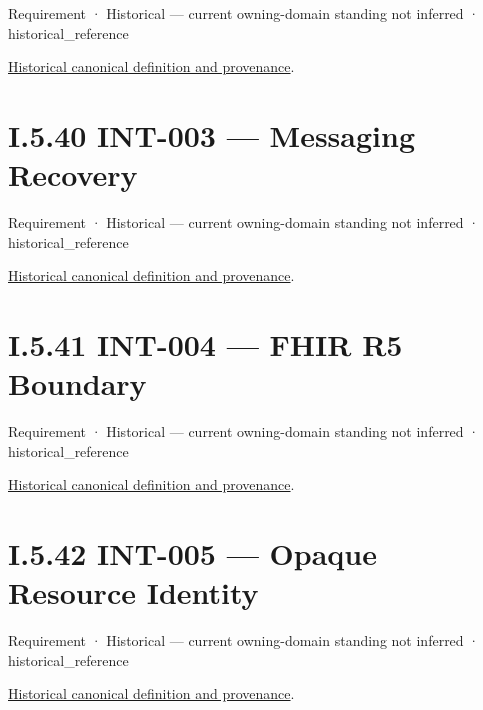 \label{element:aac9b66911e849cb9792c3a2b7eacb88}
{\small Requirement · Historical — current owning-domain standing not inferred · historical\_reference}\par
\href{../../../../continuum/motivation/requirement/aac9b66911e849cb9792c3a2b7eacb88.md}{Historical canonical definition and provenance}.\par
\section*{I.5.40 INT-003 — Messaging Recovery}
\label{navigation:I.5.40}

\label{element:6e72cf09e7cc4acf9466dd39e1a15ae6}
{\small Requirement · Historical — current owning-domain standing not inferred · historical\_reference}\par
\href{../../../../continuum/motivation/requirement/6e72cf09e7cc4acf9466dd39e1a15ae6.md}{Historical canonical definition and provenance}.\par
\section*{I.5.41 INT-004 — FHIR R5 Boundary}
\label{navigation:I.5.41}

\label{element:927b0cf4710e424391120b124067051e}
{\small Requirement · Historical — current owning-domain standing not inferred · historical\_reference}\par
\href{../../../../continuum/motivation/requirement/927b0cf4710e424391120b124067051e.md}{Historical canonical definition and provenance}.\par
\section*{I.5.42 INT-005 — Opaque Resource Identity}
\label{navigation:I.5.42}

\label{element:91bd7a8732b3468b84be2493103433e7}
{\small Requirement · Historical — current owning-domain standing not inferred · historical\_reference}\par
\href{../../../../continuum/motivation/requirement/91bd7a8732b3468b84be2493103433e7.md}{Historical canonical definition and provenance}.\par
